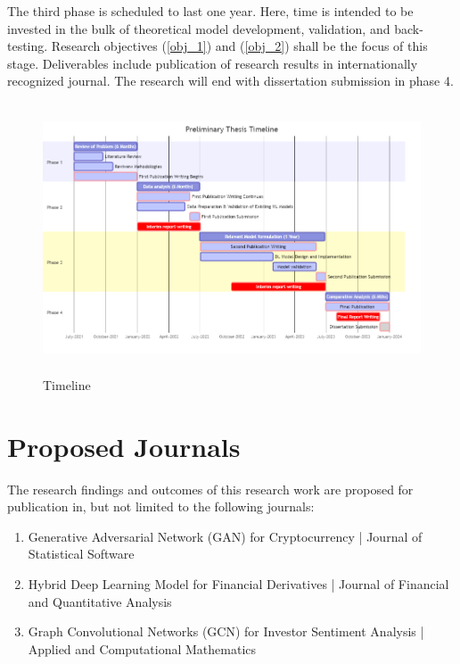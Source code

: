 \documentclass[a4paper,11pt]{scrartcl}
\begin{document}
The third phase is scheduled to last one year. Here, time is intended to be invested in the bulk of theoretical model development, validation, and back-testing. Research objectives (\ref{obj_1}) and (\ref{obj_2}) shall be the focus of this stage. Deliverables include publication of research results in internationally recognized journal. The research will end with dissertation submission in phase 4.
\begin{figure}[htb!]
    \centering
    \includegraphics[width=\textwidth,height=8cm]{mermaid-diagram-2.png}
    \caption{Timeline}
    \label{fig:my_label}
\end{figure}

\section{Proposed Journals}
The research findings and outcomes of this research work are proposed for publication in, but not limited to the following journals:
\begin{enumerate}
    \item Generative Adversarial Network (GAN) for Cryptocurrency | Journal of Statistical Software
    \item Hybrid Deep Learning Model for Financial Derivatives | Journal of Financial and Quantitative Analysis
    \item Graph Convolutional Networks (GCN) for Investor Sentiment Analysis | Applied and Computational Mathematics
\end{enumerate}



\end{document}
